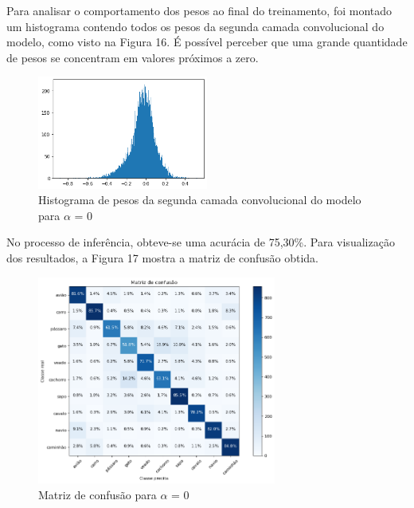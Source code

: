 Para analisar o comportamento dos pesos ao final do treinamento, foi montado um histograma contendo todos os pesos da segunda camada convolucional do modelo, como visto na Figura 16. É possível perceber que uma grande quantidade de pesos se concentram em valores próximos a zero.

\begin{figure}[H]
	\includegraphics[width=0.5\textwidth, keepaspectratio=true]{figuras/CAP4/hist0_.png}
	\centering
	\caption[Histograma de pesos da segunda camada convolucional do modelo para $\alpha$ = 0]{Histograma de pesos da segunda camada convolucional do modelo para $\alpha$ = 0}
\end{figure}

No processo de inferência, obteve-se uma acurácia de 75,30\%. Para visualização dos resultados, a Figura 17 mostra a matriz de confusão obtida. 

\begin{figure}[H]
	\includegraphics[width=0.7\textwidth, keepaspectratio=true]{figuras/CAP4/cm_0_.png}
	\centering
	\caption[Matriz de confusão para $\alpha$ = 0]{Matriz de confusão para $\alpha$ = 0}
\end{figure}


